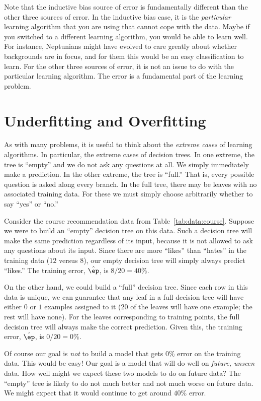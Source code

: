 Note that the inductive bias source of error is fundamentally
different than the other three sources of error.  In the inductive
bias case, it is the \emph{particular} learning algorithm that you are
using that cannot cope with the data.  Maybe if you switched to a
different learning algorithm, you would be able to learn well.  For
instance, Neptunians might have evolved to care greatly about whether
backgrounds are in focus, and for them this would be an easy
classification to learn.  For the other three sources of error, it is
not an issue to do with the particular learning algorithm.  The error
is a fundamental part of the learning problem.

\section{Underfitting and Overfitting}

As with many problems, it is useful to think about the \emph{extreme
  cases} of learning algorithms.  In particular, the extreme cases of
decision trees.  In one extreme, the tree is ``empty'' and we do not
ask any questions at all.  We simply immediately make a prediction.  In
the other extreme, the tree is ``full.''  That is, every possible
question is asked along every branch.  In the full tree, there may be
leaves with no associated training data.  For these we must simply
choose arbitrarily whether to say ``yes'' or ``no.''

Consider the course recommendation data from
Table~\ref{tab:data:course}.  Suppose we were to build an ``empty''
decision tree on this data.  Such a decision tree will make the same
prediction regardless of its input, because it is not allowed to ask
any questions about its input.  Since there are more ``likes'' than
``hates'' in the training data ($12$ versus $8$), our empty decision
tree will simply always predict ``likes.''  The training error, $\hat
\ep$, is $8/20 = 40\%$.

On the other hand, we could build a ``full'' decision tree.  Since
each row in this data is unique, we can guarantee that any leaf in a
full decision tree will have either $0$ or $1$ examples assigned to it
($20$ of the leaves will have one example; the rest will have none).
For the leaves corresponding to training points, the full decision
tree will always make the correct prediction.
Given this, the training error, $\hat \ep$, is $0/20 = 0\%$.

Of course our goal is \emph{not} to build a model that gets $0\%$
error on the training data.  This would be easy!  Our goal is a model
that will do well on \emph{future, unseen} data.  How well might we
expect these two models to do on future data?  The ``empty'' tree is
likely to do not much better and not much worse on future data.  We
might expect that it would continue to get around $40\%$ error.

